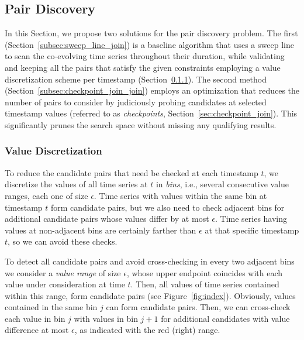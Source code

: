 
\subsection{Pair Discovery}
\label{subsec:local_sim_join_methods}

\graphicspath{{Papers/SSTD2019/}{Papers/SIGSpatial2019/}}

In this Section, we propose two solutions for the pair discovery problem. The first (Section~\ref{subsec:sweep_line_join}) is a baseline algorithm that uses a sweep line to scan the co-evolving time series throughout their duration, while validating and keeping all the pairs that satisfy the given constraints employing a value discretization scheme per timestamp (Section~\ref{subsec:indexing}). The second method (Section~\ref{subsec:checkpoint_join_join}) employs an optimization that reduces the number of pairs to consider by judiciously probing candidates at selected timestamp values (referred to as \textit{checkpoints}, Section~\ref{sec:checkpoint_join}). This significantly prunes the search space without missing any qualifying results.

\subsubsection{Value Discretization}
\label{subsec:indexing}
To reduce the candidate pairs that need be checked at each timestamp $t$, we discretize the values of all time series at $t$ in {\em bins}, i.e., several consecutive value ranges, each one of size $\epsilon$. Time series with values within the same bin at timestamp $t$ form candidate pairs, but we also need to check adjacent bins for additional candidate pairs whose values differ by at most $\epsilon$. Time series having values at non-adjacent bins are certainly farther than $\epsilon$ at that specific timestamp $t$, so we can avoid these checks. 

To detect all candidate pairs and avoid cross-checking in every two adjacent bins we consider a \textit{value range} of size $\epsilon$, whose upper endpoint coincides with each value under consideration at time $t$. Then, all values of time series contained within this range, form candidate pairs (see Figure~\ref{fig:index}). Obviously, values contained in the same bin $j$ can form candidate pairs. Then, we can cross-check each value in bin $j$ with values in bin $j+1$ for additional candidates with value difference at most $\epsilon$, as indicated with the red (right) range.

